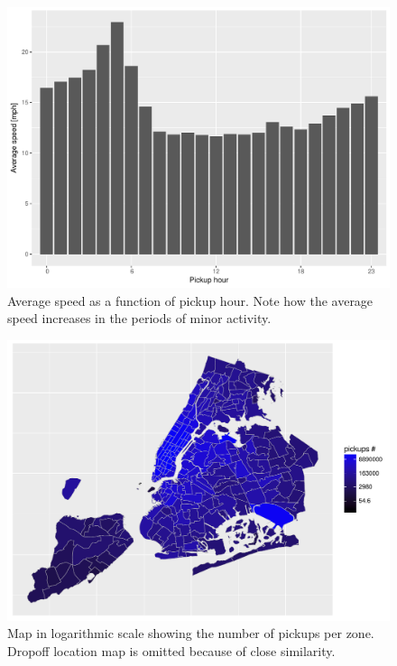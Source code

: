 \documentclass{acm_proc_article-sp-sigmod09}
\begin{document}
\begin{figure}
	\centering
	\includegraphics[width=1\columnwidth]{resources/base_plots/avg_speed_by_pickup_hour_dist.pdf}
	\caption{Average speed as a function of pickup hour. Note how the average speed increases in the periods of minor activity.}
	\label{fig:speedByHour}
\end{figure}

\begin{figure}
	\centering
	\includegraphics[width=1\columnwidth]{resources/base_plots/pickup_location_id_dist_map.pdf}
	\caption{Map in logarithmic scale showing the number of pickups per zone. Dropoff location map is omitted because of close similarity.}
	\label{fig:pickupDistributionMap}
\end{figure}
\end{document}
